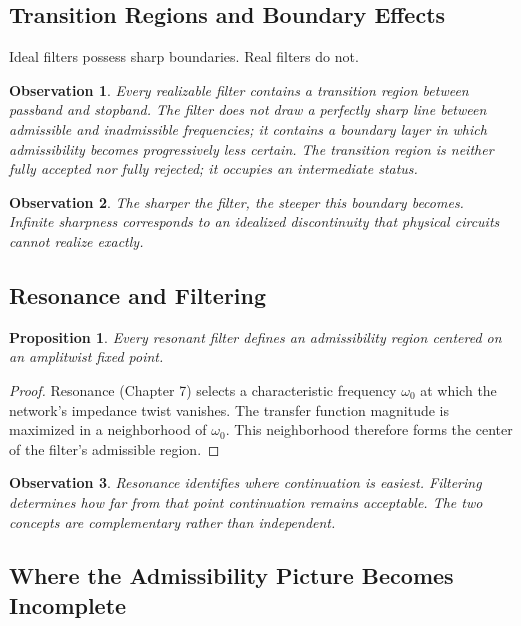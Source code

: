 \documentclass[12pt]{article}
\newtheorem{proposition}{Proposition}
\newtheorem{observation}{Observation}
\begin{document}
\subsection{Transition Regions and Boundary Effects}

Ideal filters possess sharp boundaries. Real filters do not.

\begin{observation}
Every realizable filter contains a transition region between passband and stopband. The filter does not draw a perfectly sharp line between admissible and inadmissible frequencies; it contains a boundary layer in which admissibility becomes progressively less certain. The transition region is neither fully accepted nor fully rejected; it occupies an intermediate status.
\end{observation}

\begin{observation}
The sharper the filter, the steeper this boundary becomes. Infinite sharpness corresponds to an idealized discontinuity that physical circuits cannot realize exactly.
\end{observation}

\subsection{Resonance and Filtering}

\begin{proposition}
Every resonant filter defines an admissibility region centered on an amplitwist fixed point.
\end{proposition}

\begin{proof}
Resonance (Chapter 7) selects a characteristic frequency $\omega_0$ at which the network's impedance twist vanishes. The transfer function magnitude is maximized in a neighborhood of $\omega_0$. This neighborhood therefore forms the center of the filter's admissible region.
\end{proof}

\begin{observation}
Resonance identifies where continuation is easiest. Filtering determines how far from that point continuation remains acceptable. The two concepts are complementary rather than independent.
\end{observation}

\subsection{Where the Admissibility Picture Becomes Incomplete}
\end{document}
